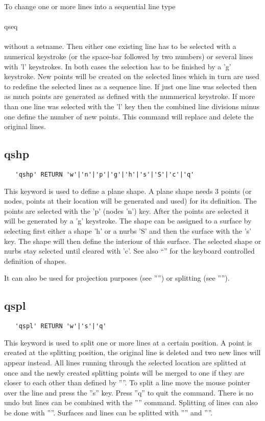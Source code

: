 \documentclass{article}
\begin{document}
To change one or more lines into a sequential line type\\\\qseq\\\\without a setname. Then either one existing line has to be selected with a numerical keystroke (or the space-bar followed by two numbers) or several lines with 'l' keystrokes. In both cases the selection has to be finished by a 'g' keystroke. New points will be created on the selected lines which in turn are used to redefine the selected lines as a sequence line. If just one line was selected then as much points are generated as defined with the nummerical keystroke. If more than one line was selected with the 'l' key then the combined line divisions minus one define the number of new points. This command will replace and delete the original lines.

\subsection{\label{qshp}qshp}
\begin{verbatim}
   'qshp' RETURN 'w'|'n'|'p'|'g'|'h'|'s'|'S'|'c'|'q'
\end{verbatim}
This keyword is used to define a plane shape. A plane shape needs 3 points (or nodes, points at their location will be generated and used) for its definition. The points are selected with the 'p' (nodes 'n') key. After the points are selected it will be generated by a 'g' keystroke. The shape can be assigned to a surface by selecting first either a shape 'h' or a nurbs 'S' and then the surface with the 's' key. The shape will then define the interiour of this surface. The selected shape or nurbs stay selected until cleared with 'c'. See also ``'' for the keyboard controlled definition of shapes.

It can also be used for projection purposes (see '''') or splitting (see '''').

\subsection{\label{qspl}qspl}
\begin{verbatim}
   'qspl' RETURN 'w'|'s'|'q' 
\end{verbatim}
This keyword is used to split one or more lines at a certain position. A point is created at the splitting position, the original line is deleted and two new lines will appear instead. All lines running through the selected location are splitted at once and the newly created splitting points will be merged to one if they are closer to each other than defined by ''''. To split a line move the mouse pointer over the line and press the ''s'' key. Press ''q'' to quit the command. There is no undo but lines can be combined with the '''' command. Splitting of lines can also be done with ''''. Surfaces and lines can be splitted with '''' and ''''.
\end{document}
